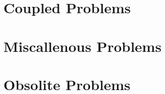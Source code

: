 \documentclass[a4paper,english]{report}    %
\begin{document}
\part{Coupled Problems}

\graphicspath{{./}{RayleighBenardGUI/}}


%

\graphicspath{{./}{InductionHeating/}}


\graphicspath{{./}{FluidStructureBeam/}}


\graphicspath{{./}{ThermalActuator/}}


\graphicspath{{./}{CoatingProcess/}}


\graphicspath{{./}{ArteryFlow/}}




\part{Miscallenous Problems}

\graphicspath{{./}{TemperatureOperatorSplitting/}}


\graphicspath{{./}{PoissonBEM/}}


\graphicspath{{./}{Temperature1D/}}


\graphicspath{{./}{FlowLinearRestriction/}}


\graphicspath{{./}{FlowStreamlines/}}


\graphicspath{{./}{Microfluidic/}}


\graphicspath{{./}{PassiveElements/}}



%

\part{Obsolite Problems}

\graphicspath{{./}{TemperatureAngle/}}


\graphicspath{{./}{RayleighBenard/}}




\appendix

%


\printindex

\end{document}
